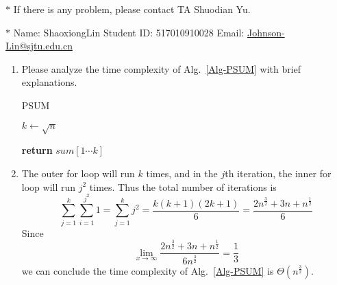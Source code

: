 \documentclass[12pt,a4paper]{article}
\makeatletter
\newtheorem*{solution}{Solution}
\theoremstyle{definition}
\renewenvironment{solution}[1][Solution] {\par\pushQED{\qed}\normalfont\topsep6\p@\@plus6\p@\relax\trivlist\item[\hskip\labelsep\bfseries#1\@addpunct{.}]\ignorespaces}{\popQED\endtrivlist\@endpefalse} \makeatother
\makeatother
\begin{document}
\noindent

\noindent{}
\begin{center}
\footnotesize{\color{red}$*$ If there is any problem, please contact TA Shuodian Yu.}

\footnotesize{\color{blue}$*$ Name: ShaoxiongLin  \quad Student ID: 517010910028 \quad Email: \href{mailto:Johnson-Lin@sjtu.edu.cn}{Johnson-Lin@sjtu.edu.cn}}
\end{center}

\begin{enumerate}
    \item
    Please analyze the time complexity of Alg.~\ref{Alg-PSUM} with brief explanations.

    \begin{minipage}[t]{0.8\textwidth}
    \begin{algorithm}[H]
        \caption{PSUM}\label{Alg-PSUM}

        \BlankLine

        $k \leftarrow \sqrt{n}$\;


        {\bf return} $sum[1\cdots k]$\;
    \end{algorithm}
    \end{minipage}

    \begin{solution}
        The outer for loop will run $k$ times, and in the $j$th iteration, the inner for loop will run $j^{2}$ times. Thus the total number of iterations is$$\sum_{j=1}^{k}\sum_{i=1}^{j^{2}}1 = \sum_{j=1}^{k}j^{2} = \frac{k(k+1)(2k+1)}{6} = \frac{2n^{\frac{3}{2}}+3n+n^{\frac{1}{2}}}{6}$$
        Since $$\lim_{x\rightarrow\infty}\frac{2n^{\frac{3}{2}}+3n+n^{\frac{1}{2}}}{6n^{\frac{3}{2}}} = \frac{1}{3}$$we can conclude the time complexity of Alg.~\ref{Alg-PSUM} is $\Theta(n^{\frac{3}{2}})$.
    \end{solution}


\end{enumerate}
\end{document}
